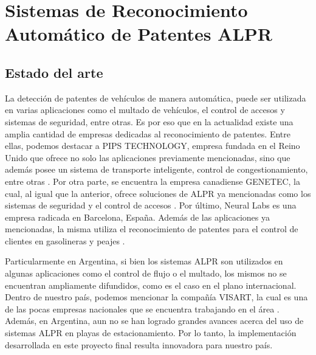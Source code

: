 \section{Sistemas de Reconocimiento Automático de Patentes ALPR}\label{sec:sysALPR}

\subsection{Estado del arte}
La detección de patentes de vehículos de manera automática, puede ser utilizada en varias aplicaciones como el multado de vehículos, el control de accesos y sistemas de seguridad, entre otras. Es por eso que en la actualidad existe una amplia cantidad de empresas dedicadas al reconocimiento de patentes. Entre ellas, podemos destacar a PIPS TECHNOLOGY, empresa fundada en el Reino Unido que ofrece no solo las aplicaciones previamente mencionadas, sino que además posee un sistema de transporte inteligente, control de congestionamiento, entre otras \cite{pipstechnology} . Por otra parte, se encuentra la empresa canadiense GENETEC, la cual, al igual que la anterior, ofrece soluciones de ALPR ya mencionadas como los sistemas de seguridad y el control de accesos \cite{genetec}. Por último, Neural Labs es una empresa radicada en Barcelona, España. Además de las aplicaciones ya mencionadas, la misma utiliza el reconocimiento de patentes para el control de clientes en gasolineras y peajes \cite{neurallabs}.

Particularmente en Argentina, si bien los sistemas ALPR son utilizados en algunas aplicaciones como el control de flujo o el multado, los mismos no se encuentran ampliamente difundidos, como es el caso en el plano internacional. Dentro de nuestro país, podemos mencionar la compañía VISART, la cual es una de las pocas empresas nacionales que se encuentra trabajando en el área \cite{visart}.
Además, en Argentina, aun no se han logrado grandes avances acerca del uso de sistemas ALPR en playas de estacionamiento. Por lo tanto, la implementación desarrollada en este proyecto final resulta innovadora para nuestro país.



